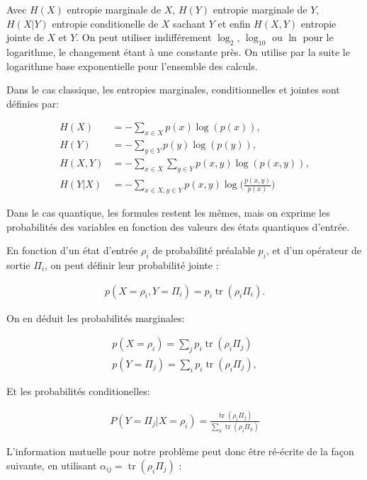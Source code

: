 \documentclass[12pt,a4paper]{article}
\DeclareMathOperator{\tr}{tr}
\begin{document}
    Avec $H(X)$ entropie marginale de $X$, $H(Y)$ entropie marginale de $Y$, $H(X|Y)$ entropie conditionelle de $X$ sachant $Y$ et enfin $H(X, Y)$ entropie jointe de $X$ et $Y$. On peut utiliser indifférement $\log_2$, $\log_{10}$ ou $\ln$ pour le logarithme, le changement étant à une constante près. On utilise par la suite le logarithme base exponentielle pour l'ensemble des calculs.

    Dans le cas classique, les entropies marginales, conditionnelles et jointes sont définies par: 
    
    \begin{align}
        H(X) &= -\displaystyle \sum_{x \in X} p(x) \log(p(x)) , \\
        H(Y) &= -\displaystyle \sum_{y \in Y} p(y) \log(p(y)) , \\
        H(X, Y) &= -\displaystyle \sum_{x \in X} \displaystyle \sum_{y \in Y} p(x, y) \log(p(x, y)), \\
        H(Y|X) &= -\displaystyle \sum_{x \in X, y \in Y} p(x, y) \log \big(\frac{p(x, y)}{p(x)}\big)
    \end{align}

    Dans le cas quantique, les formules restent les mêmes, mais on exprime les probabilités des variables en fonction des valeurs des états quantiques d'entrée.

    En fonction d'un état d'entrée $\rho_i$ de probabilité préalable $p_i$, et d'un opérateur de sortie $\Pi_i$, on peut définir leur probabilité jointe :

    \begin{align}
        p(X = \rho_i, Y = \Pi_i) = p_i \tr(\rho_i \Pi_i).
    \end{align}

    On en déduit les probabilités marginales:

    \begin{align}
        p(X = \rho_i) = \displaystyle \sum_{j}p_i \tr(\rho_i \Pi_j)  \\
        p(Y = \Pi_j) = \displaystyle \sum_{i}p_i \tr(\rho_i \Pi_j),
    \end{align}

    Et les probabilités conditionelles:

    \begin{align}
        P(Y=\Pi_j | X=\rho_i) = \frac{\tr(\rho_i \Pi_j)}{\displaystyle \sum_{k} \tr(\rho_i \Pi_k)}
    \end{align}

    L'information mutuelle pour notre problème peut donc être ré-écrite de la façon suivante, en utilisant $\alpha_{ij} = \tr(\rho_i \Pi_j)$ :
\end{document}
